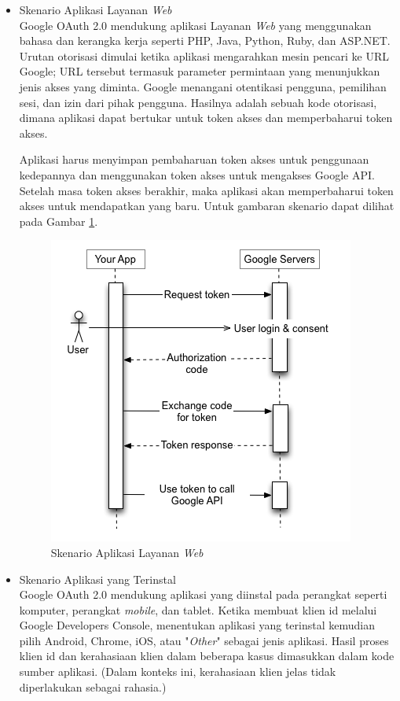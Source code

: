 \begin{itemize}
\item Skenario Aplikasi Layanan {\it Web}\\
Google OAuth 2.0 mendukung aplikasi Layanan {\it Web} yang menggunakan bahasa
dan kerangka kerja seperti PHP, Java, Python, Ruby, dan ASP.NET. Urutan
otorisasi dimulai ketika aplikasi mengarahkan mesin pencari ke URL Google; URL
tersebut termasuk parameter permintaan yang menunjukkan jenis akses yang
diminta. Google menangani otentikasi pengguna, pemilihan sesi, dan izin dari
pihak pengguna. Hasilnya adalah sebuah kode otorisasi, dimana aplikasi dapat
bertukar untuk token akses dan memperbaharui token akses.

Aplikasi harus menyimpan pembaharuan token akses untuk penggunaan kedepannya dan
menggunakan token akses untuk mengakses Google API. Setelah masa token akses
berakhir, maka aplikasi akan memperbaharui token akses untuk mendapatkan yang
baru. Untuk gambaran skenario dapat dilihat pada Gambar
\ref{fig:skenarioaplikasiwebserver}.

\begin{figure}[p]
\centering
\includegraphics[scale=1]{Gambar/skenario1.png}
\caption[Skenario Aplikasi Layanan {\it Web}]{Skenario Aplikasi Layanan {\it
Web}}
\label{fig:skenarioaplikasiwebserver}
\end{figure}

\item Skenario Aplikasi yang Terinstal\\
Google OAuth 2.0 mendukung aplikasi yang diinstal pada perangkat seperti
komputer, perangkat {\it mobile}, dan tablet. Ketika membuat klien id melalui
Google Developers Console, menentukan aplikasi yang terinstal kemudian pilih
Android, Chrome, iOS, atau "{\it Other}" sebagai jenis aplikasi. Hasil proses
klien id dan kerahasiaan klien dalam beberapa kasus dimasukkan dalam kode sumber
aplikasi. (Dalam konteks ini, kerahasiaan klien jelas tidak diperlakukan sebagai rahasia.)


\end{itemize}
